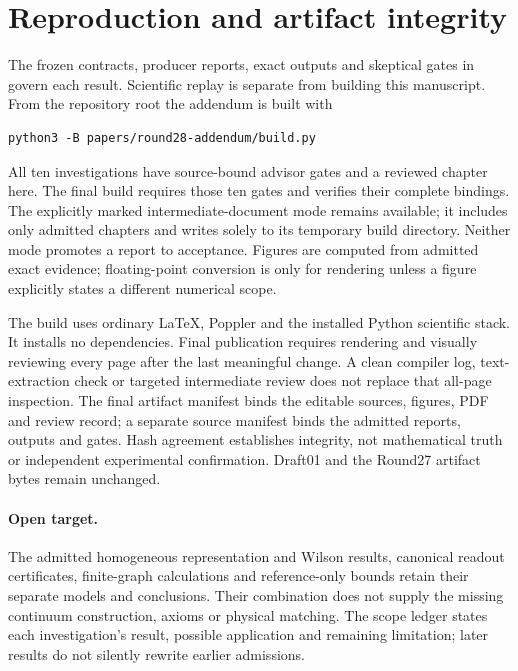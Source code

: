\section{Reproduction and artifact integrity}
The frozen contracts, producer reports, exact outputs and skeptical gates in  govern each result. Scientific replay is separate from building this manuscript. From the repository root the addendum is built with
\begin{verbatim}
python3 -B papers/round28-addendum/build.py
\end{verbatim}
All ten investigations have source-bound advisor gates and a reviewed chapter here. The final build requires those ten gates and verifies their complete bindings. The explicitly marked intermediate-document mode  remains available; it includes only admitted chapters and writes solely to its temporary build directory. Neither mode promotes a report to acceptance. Figures are computed from admitted exact evidence; floating-point conversion is only for rendering unless a figure explicitly states a different numerical scope.

The build uses ordinary \LaTeX, Poppler and the installed Python scientific stack. It installs no dependencies. Final publication requires rendering and visually reviewing every page after the last meaningful change. A clean compiler log, text-extraction check or targeted intermediate review does not replace that all-page inspection. The final artifact manifest binds the editable sources, figures, PDF and review record; a separate source manifest binds the admitted reports, outputs and gates. Hash agreement establishes integrity, not mathematical truth or independent experimental confirmation. Draft01 and the Round27 artifact bytes remain unchanged.

\paragraph{Open target.} The admitted homogeneous representation and Wilson results, canonical readout certificates, finite-graph calculations and reference-only bounds retain their separate models and conclusions. Their combination does not supply the missing continuum construction, axioms or physical matching. The scope ledger states each investigation's result, possible application and remaining limitation; later results do not silently rewrite earlier admissions.
